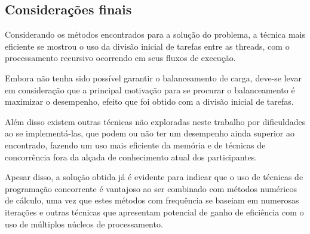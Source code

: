 \documentclass[11pt]{article}
\begin{document}
\subsection{Considerações finais}
\label{sec:orga4b23ba}
Considerando os métodos encontrados para a solução do problema, a técnica mais eficiente se mostrou o uso
da divisão inicial de tarefas entre as threads, com o processamento recursivo ocorrendo em seus fluxos de
execução.

Embora não tenha sido possível garantir o balanceamento de carga, deve-se levar em consideração que
a principal motivação para se procurar o balanceamento é maximizar o desempenho, efeito que foi
obtido com a divisão inicial de tarefas.

Além disso existem outras técnicas não exploradas neste trabalho por dificuldades ao se implementá-las,
que podem ou não ter um desempenho ainda superior ao encontrado, fazendo um uso mais eficiente da memória
e de técnicas de concorrência fora da alçada de conhecimento atual dos participantes.

Apesar disso, a solução obtida já é evidente para indicar que o uso de técnicas de programação
concorrente é vantajoso ao ser combinado com métodos numéricos de cálculo, uma vez que estes métodos
com frequência se baseiam em numerosas iterações e outras técnicas que apresentam potencial de
ganho de eficiência com o uso de múltiplos núcleos de processamento.
\end{document}
